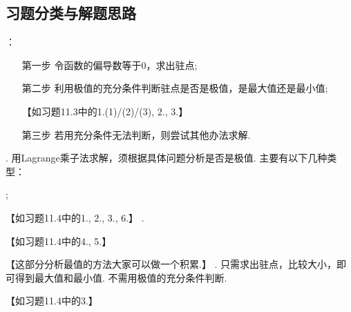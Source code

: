 \documentclass[12pt,UTF8]{ctexart}
\begin{document}
\subsection{习题分类与解题思路}
\begin{enumerate}
：
\begin{enumerate}
\item[第一步]令函数的偏导数等于0，求出驻点;
\item[第二步]利用极值的充分条件判断驻点是否是极值，是最大值还是最小值;

【如习题11.3中的1.(1)/(2)/(3), 2., 3.】
\item[第三步]若用充分条件无法判断，则尝试其他办法求解.
\end{enumerate}
. 用Lagrange乘子法求解，须根据具体问题分析是否是极值. 主要有以下几种类型：
\begin{enumerate}
;

【如习题11.4中的1., 2., 3., 6.】
.

【如习题11.4中的4., 5.】
\end{enumerate}
【这部分分析最值的方法大家可以做一个积累.】
. 只需求出驻点，比较大小，即可得到最大值和最小值. 不需用极值的充分条件判断.

【如习题11.4中的3.】
\end{enumerate}
\end{document}
